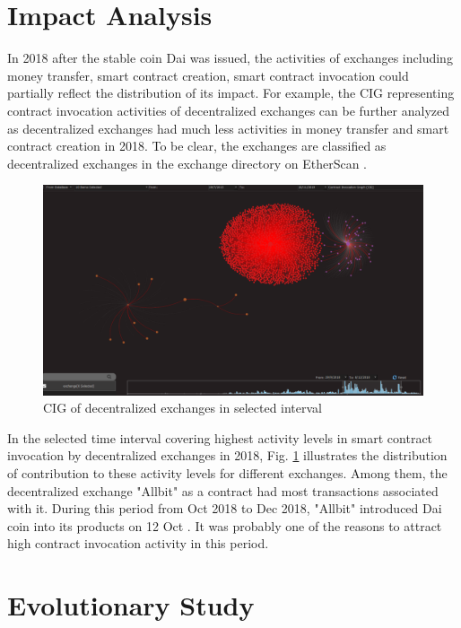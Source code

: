 \section{Impact Analysis}
\label{sec:evaluation:impact}

In 2018 after the stable coin Dai was issued, the activities of exchanges including money transfer, smart contract creation, smart contract invocation could partially reflect the distribution of its impact. For example, the CIG representing contract invocation activities of decentralized exchanges can be further analyzed as decentralized exchanges had much less activities in money transfer and smart contract creation in 2018. To be clear, the exchanges are classified as decentralized exchanges in the exchange directory on EtherScan \cite{17}.

\begin{figure}[htb]
\includegraphics[width=\textwidth]{gfx/impact-analysis.png}
\caption{CIG of decentralized exchanges in selected interval}
\label{fig:impact-analysis}
\end{figure}

In the selected time interval covering highest activity levels in smart contract invocation by decentralized exchanges in 2018, Fig. \ref{fig:impact-analysis} illustrates the distribution of contribution to these activity levels for different exchanges. Among them, the decentralized exchange "Allbit" as a contract had most transactions associated with it. During this period from Oct 2018 to Dec 2018, "Allbit" introduced Dai coin into its products on 12 Oct \cite{22}. It was probably one of the reasons to attract high contract invocation activity in this period. 

\section{Evolutionary Study}
\label{sec:evaluation:evolution}

